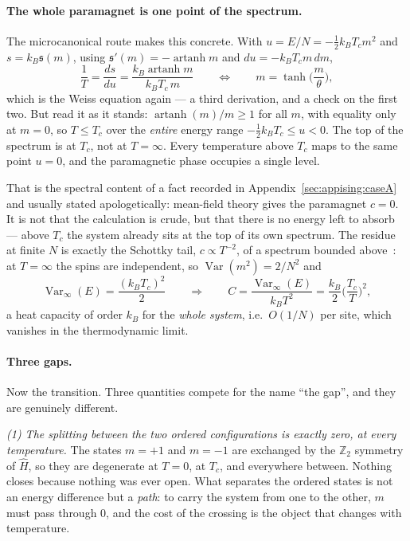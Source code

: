 \documentclass[10pt,a4paper]{article}
\theoremstyle{remark}
\newcommand{\Var}{\operatorname{Var}}
\begin{document}
\paragraph{The whole paramagnet is one point of the spectrum.} The microcanonical
route makes this concrete. With $u=E/N=-\tfrac12k_BT_cm^{2}$ and
$s=k_B\mathfrak{s}(m)$, using $\mathfrak{s}'(m)=-\operatorname{artanh}m$ and
$du=-k_BT_c m\,dm$,
\begin{equation}\label{eq:isspec_micro}
\frac{1}{T}=\frac{ds}{du}
=\frac{k_B\operatorname{artanh}m}{k_BT_c\,m}
\qquad\Longleftrightarrow\qquad
m=\tanh\Big(\frac{m}{\theta}\Big),
\end{equation}
which is the Weiss equation again --- a third derivation, and a check on the
first two. But read it as it stands: $\operatorname{artanh}(m)/m\geq1$ for all
$m$, with equality only at $m=0$, so $T\leq T_c$ over the \emph{entire} energy
range $-\tfrac12k_BT_c\leq u<0$. The top of the spectrum is at $T_c$, not at
$T=\infty$. Every temperature above $T_c$ maps to the same point $u=0$, and the
paramagnetic phase occupies a single level.

That is the spectral content of a fact recorded in Appendix~\ref{sec:appising:caseA}
and usually stated apologetically: mean-field theory gives the paramagnet
$c=0$. It is not that the calculation is crude, but that there is no energy left
to absorb --- above $T_c$ the system already sits at the top of its own spectrum.
The residue at finite $N$ is exactly the Schottky tail, $c\propto T^{-2}$, of a spectrum bounded above~\cite{DOSNotes}: at $T=\infty$ the spins are independent, so
$\Var(m^{2})=2/N^{2}$ and
\begin{equation}\label{eq:isspec_schottky}
\Var_\infty(E)=\frac{(k_BT_c)^{2}}{2}
\qquad\Longrightarrow\qquad
C=\frac{\Var_\infty(E)}{k_BT^{2}}=\frac{k_B}{2}\Big(\frac{T_c}{T}\Big)^{2},
\end{equation}
a heat capacity of order $k_B$ for the \emph{whole system}, i.e.\ $O(1/N)$ per
site, which vanishes in the thermodynamic limit.

\paragraph{Three gaps.} Now the transition. Three quantities compete for the name
``the gap'', and they are genuinely different.

\emph{(1) The splitting between the two ordered configurations is exactly zero,
at every temperature.} The states $m=+1$ and $m=-1$ are exchanged by the
$\mathbb{Z}_2$ symmetry of $\hat H$, so they are degenerate at $T=0$, at $T_c$,
and everywhere between. Nothing closes because nothing was ever open. What
separates the ordered states is not an energy difference but a \emph{path}: to
carry the system from one to the other, $m$ must pass through $0$, and the cost of
the crossing is the object that changes with temperature.
\end{document}
